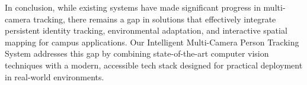 In conclusion, while existing systems have made significant progress in multi-camera tracking, there remains a gap in solutions that effectively integrate persistent identity tracking, environmental adaptation, and interactive spatial mapping for campus applications. Our Intelligent Multi-Camera Person Tracking System addresses this gap by combining state-of-the-art computer vision techniques with a modern, accessible tech stack designed for practical deployment in real-world environments.